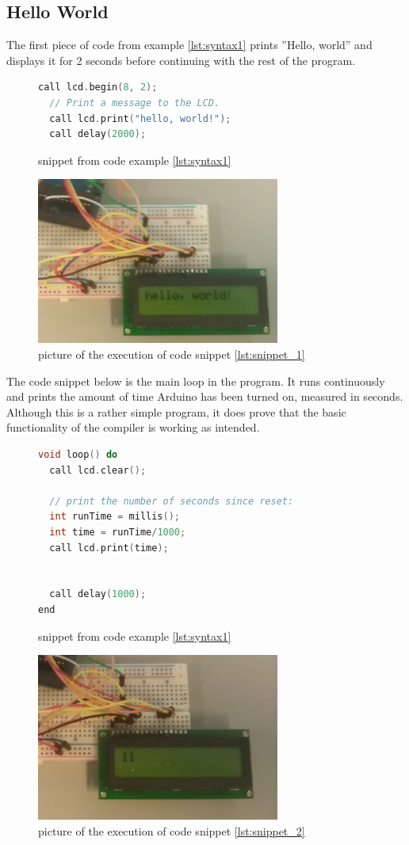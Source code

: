 \subsection*{Hello World}
The first piece of code from example \ref{lst:syntax1} prints ''Hello, world'' and displays it for 2 seconds before continuing with the rest of the program.
\begin{figure}[h]
\begin{lstlisting}[caption=Hello World ,firstnumber=11, language={C++}, label=lst:snippet_1]
  call lcd.begin(8, 2);
  // Print a message to the LCD.
  call lcd.print("hello, world!");
  call delay(2000);
\end{lstlisting}
\caption{snippet from code example \ref{lst:syntax1}}
\end{figure}
\begin{figure}[h]
\centering
\includegraphics[width=8cm]{billeder/test_hello_1.jpg}
\caption{picture of the execution of code snippet \ref{lst:snippet_1}}
\end{figure}

The code snippet below is the main loop in the program. It runs continuously and prints the amount of time Arduino has been turned on, measured in seconds. Although this is a rather simple program, it does prove that the basic functionality of the compiler is working as intended.
\begin{figure}[h]
\begin{lstlisting}[caption=Hello World ,firstnumber=17, language={C++},label=lst:snippet_2]
void loop() do
  call lcd.clear();

  // print the number of seconds since reset:
  int runTime = millis();
  int time = runTime/1000;
  call lcd.print(time);


  call delay(1000);
end
\end{lstlisting}
\caption{snippet from code example \ref{lst:syntax1}}
\end{figure}
\begin{figure}[htb]
\centering
\includegraphics[width=8cm]{billeder/test_hello_2.jpg}
\caption{picture of the execution of code snippet \ref{lst:snippet_2}}
\end{figure}


